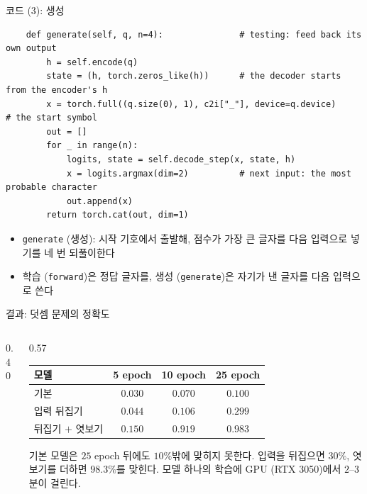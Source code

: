 \documentclass[aspectratio=169,11pt]{beamer}
\begin{document}
\begin{frame}[fragile]{코드 (3): 생성}
\begin{lstlisting}
    def generate(self, q, n=4):               # testing: feed back its own output
        h = self.encode(q)
        state = (h, torch.zeros_like(h))      # the decoder starts from the encoder's h
        x = torch.full((q.size(0), 1), c2i["_"], device=q.device)     # the start symbol
        out = []
        for _ in range(n):
            logits, state = self.decode_step(x, state, h)
            x = logits.argmax(dim=2)          # next input: the most probable character
            out.append(x)
        return torch.cat(out, dim=1)
\end{lstlisting}
\begin{itemize}
\item \texttt{generate} (생성): 시작 기호에서 출발해,
점수가 가장 큰 글자를 다음 입력으로 넣기를 네 번 되풀이한다
\item 학습 (\texttt{forward})은 정답 글자를, 생성 (\texttt{generate})은 자기가 낸 글자를 다음 입력으로 쓴다
\end{itemize}
\end{frame}

\begin{frame}{결과: 덧셈 문제의 정확도}
\begin{columns}[c,onlytextwidth]
\begin{column}{0.40\textwidth}
\end{column}
\begin{column}{0.57\textwidth}
\small
\setlength{\tabcolsep}{4pt}
\begin{tabular}{@{}lccc@{}}
\toprule
모델 & 5 epoch & 10 epoch & 25 epoch \\
\midrule
기본 & $0.030$ & $0.070$ & $0.100$ \\
입력 뒤집기 & $0.044$ & $0.106$ & $0.299$ \\
뒤집기 $+$ 엿보기 & $0.150$ & $0.919$ & $0.983$ \\
\bottomrule
\end{tabular}
\vskip3mm
\normalsize
기본 모델은 $25$ epoch 뒤에도 $10\%$밖에 맞히지 못한다.
입력을 뒤집으면 $30\%$, 엿보기를 더하면 $98.3\%$를 맞힌다.
\vskip2mm
\footnotesize
모델 하나의 학습에 GPU (RTX 3050)에서 $2$--$3$분이 걸린다.
\end{column}
\end{columns}
\end{frame}
\end{document}
